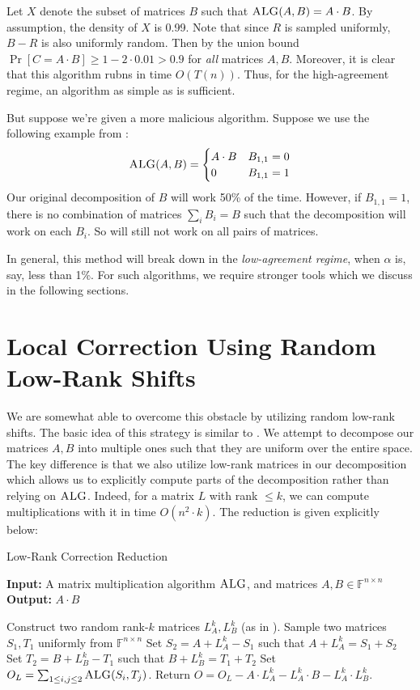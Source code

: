 \documentclass[12pt]{caltech_thesis}
\def\F{\mathbb{F}}
\begin{document}
Let $X$ denote the subset of matrices $B$ such that $\textsc{ALG}(A, B) = A \cdot B$. By assumption, the density of $X$ is 0.99. Note that since $R$ is sampled uniformly, $B-R$ is also uniformly random. Then by the union bound $\Pr[C = A\cdot B] \geq 1 - 2\cdot 0.01 > 0.9$ for \textit{all} matrices $A,B$. Moreover, it is clear that this algorithm rubns in time $O(T(n))$. Thus, for the high-agreement regime, an algorithm as simple as  is sufficient.

But suppose we're given a more malicious algorithm. Suppose we use the following example from \cite{asadi2022worstcase}:
\begin{equation*}
    \textsc{ALG}(A, B) = \begin{cases}
        A\cdot B & B_{1,1} = 0\\
        0 & B_{1,1} = 1
    \end{cases}
\end{equation*}
Our original decomposition of $B$ will work 50\% of the time. However, if $B_{1,1} = 1$, there is no combination of matrices $\sum_i B_i = B$ such that the decomposition will work on each $B_i$. So  will still not work on all pairs of matrices.

In general, this method will break down in the \textit{low-agreement regime}, when $\alpha$ is, say, less than 1\%. For such algorithms, we require stronger tools which we discuss in the following sections.

\section{Local Correction Using Random Low-Rank Shifts}

We are somewhat able to overcome this obstacle by utilizing random low-rank shifts. The basic idea of this strategy is similar to . We attempt to decompose our matrices $A,B$ into multiple ones such that they are uniform over the entire space. The key difference is that we also utilize low-rank matrices in our decomposition which allows us to explicitly compute parts of the decomposition rather than relying on $\textsc{ALG}$. Indeed, for a matrix $L$ with rank $\leq k$, we can compute multiplications with it in time $O(n^2\cdot k)$. The reduction is given explicitly below:
\begin{algorithm}
\caption{Low-Rank Correction Reduction}\label{alg:low-rank}
\textbf{Input:} A matrix multiplication algorithm $\textsc{ALG}$, and matrices $A,B \in \F^{n \times n}$\\
\textbf{Output:} $A \cdot B$
\begin{algorithmic}[1]
\State Construct two random rank-$k$ matrices $L_A^k, L_B^k$ (as in ).
\State Sample two matrices $S_1, T_1$ uniformly from $\F^{n\times n}$
\State Set $S_2 = A + L_A^k - S_1$ such that $A + L_A^k = S_1 + S_2$
\State Set $T_2 = B + L_B^k - T_1$ such that $B + L_B^k = T_1 + T_2$
\State Set $O_L = \sum_{1 \leq i, j \leq 2} \textsc{ALG}(S_i, T_j)$.
\State Return $O = O_L - A\cdot L_A^k - L_A^k \cdot B - L_A^k \cdot L_B^k$.
\end{algorithmic}
\end{algorithm}
\end{document}
